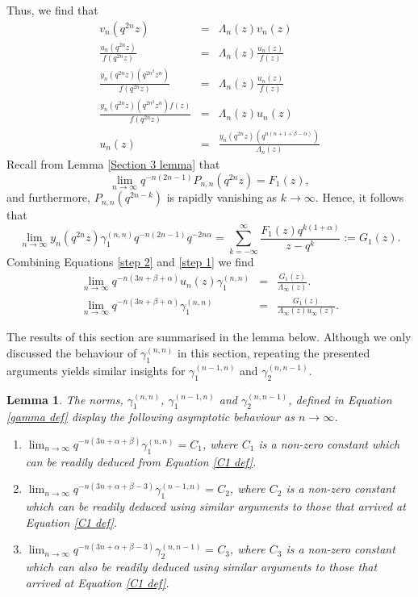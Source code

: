 \documentclass[a4paper,reqno]{amsart}
\numberwithin{equation}{section}
\newtheorem{lemma}[theorem]{Lemma}
\numberwithin{figure}{section}
\begin{document}
Thus, we find that
\begin{eqnarray}
    v_n(q^{2n}z) &=& \Lambda_{n}(z)v_n(z)\nonumber \\
    \frac{u_n(q^{2n}z)}{f(q^{2n}z)} &=& \Lambda_{n}(z)\frac{u_n(z)}{f(z)} \nonumber \\
    \frac{y_n(q^{2n}z)\left( q^{2n^2}z^n\right)}{f(q^{2n}z)} &=& \Lambda_{n}(z)\frac{ u_n(z)}{f(z)} \nonumber \\
    \frac{y_n(q^{2n}z)\left( q^{2n^2}z^n\right)f(z)}{f(q^{2n}z)} &=& \Lambda_{n}(z)u_n(z)\nonumber \\
    u_n(z) &=& \frac{y_n(q^{2n}z)\left( q^{n(n+1+\beta-\alpha)}\right)}{\Lambda_{n}(z)} \label{step 2}
\end{eqnarray}
Recall from Lemma \ref{Section 3 lemma} that
\[ \lim_{n\to\infty} q^{-n(2n-1)}P_{n,n}(q^{2n}z) = F_1(z),\]
and furthermore, $P_{n,n}(q^{2n-k})$ is rapidly vanishing as $k\to\infty$. Hence, it follows that 
\begin{equation}\label{step 1}
\lim_{n\to\infty}y_n(q^{2n}z)\gamma_1^{(n,n)}q^{-n(2n-1)}q^{-2n\alpha} = \sum_{k= -\infty}^\infty \frac{F_1(z)q^{k(1+\alpha)}}{z-q^k}:=G_1(z).
\end{equation}
Combining Equations \eqref{step 2} and \eqref{step 1} we find
\begin{eqnarray}\label{C1 def}
    \lim_{n\to\infty} q^{-n(3n+\beta+\alpha)}u_n(z)\gamma_1^{(n,n)} &=& \frac{G_1(z)}{\Lambda_{\infty}(z)} .\nonumber \\
    \lim_{n\to\infty} q^{-n(3n+\beta+\alpha)}\gamma_1^{(n,n)} &=& \frac{G_1(z)}{\Lambda_{\infty}(z)u_\infty(z)} .
\end{eqnarray} 

The results of this section are summarised in the lemma below. Although we only discussed the behaviour of $\gamma_1^{(n,n)}$ in this section, repeating the presented arguments yields similar insights for $\gamma_1^{(n-1,n)}$ and $\gamma_2^{(n,n-1)}$.

\begin{lemma}\label{Section 4 lemma}
    The norms, $\gamma_1^{(n,n)}$, $\gamma_1^{(n-1,n)}$ and $\gamma_2^{(n,n-1)}$, defined in Equation \eqref{gamma def} display the following asymptotic behaviour as $n\to\infty$.
    \begin{enumerate}
    \item $\lim_{n\to\infty}q^{-n(3n+\alpha+\beta)}\gamma_1^{(n,n)} = C_1$, where $C_1$ is a non-zero constant which can be readily deduced from Equation \eqref{C1 def}.
    \item $\lim_{n\to\infty}q^{-n(3n+\alpha+\beta-3)}\gamma_1^{(n-1,n)} = C_2$, where $C_2$ is a non-zero constant which can be readily deduced using similar arguments to those that arrived at Equation \eqref{C1 def}.
    \item $\lim_{n\to\infty}q^{-n(3n+\alpha+\beta-3)}\gamma_2^{(n,n-1)} = C_3$, where $C_3$ is a non-zero constant which can also be readily deduced using similar arguments to those that arrived at Equation \eqref{C1 def}.
    \end{enumerate}
\end{lemma}
\end{document}
